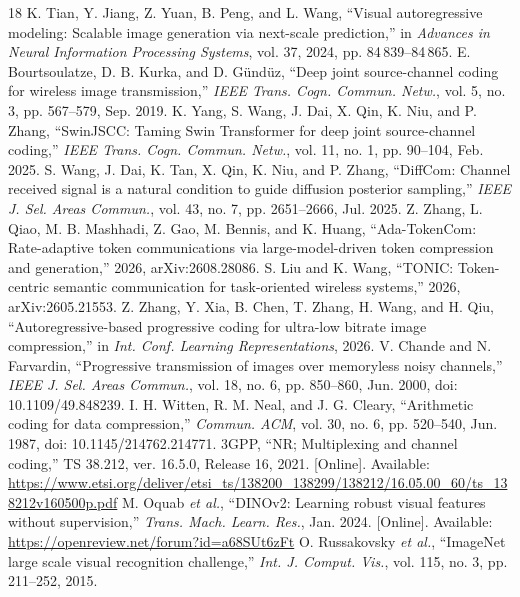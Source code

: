 \begin{thebibliography}{18}
 K. Tian, Y. Jiang, Z. Yuan, B. Peng, and L. Wang, ``Visual autoregressive modeling: Scalable image generation via next-scale prediction,'' in \emph{Advances in Neural Information Processing Systems}, vol. 37, 2024, pp. 84\,839--84\,865.
 E. Bourtsoulatze, D. B. Kurka, and D. G\"und\"uz, ``Deep joint source-channel coding for wireless image transmission,'' \emph{IEEE Trans. Cogn. Commun. Netw.}, vol. 5, no. 3, pp. 567--579, Sep. 2019.
 K. Yang, S. Wang, J. Dai, X. Qin, K. Niu, and P. Zhang, ``SwinJSCC: Taming Swin Transformer for deep joint source-channel coding,'' \emph{IEEE Trans. Cogn. Commun. Netw.}, vol. 11, no. 1, pp. 90--104, Feb. 2025.
 S. Wang, J. Dai, K. Tan, X. Qin, K. Niu, and P. Zhang, ``DiffCom: Channel received signal is a natural condition to guide diffusion posterior sampling,'' \emph{IEEE J. Sel. Areas Commun.}, vol. 43, no. 7, pp. 2651--2666, Jul. 2025.
 Z. Zhang, L. Qiao, M. B. Mashhadi, Z. Gao, M. Bennis, and K. Huang, ``Ada-TokenCom: Rate-adaptive token communications via large-model-driven token compression and generation,'' 2026, arXiv:2608.28086.
 S. Liu and K. Wang, ``TONIC: Token-centric semantic communication for task-oriented wireless systems,'' 2026, arXiv:2605.21553.
 Z. Zhang, Y. Xia, B. Chen, T. Zhang, H. Wang, and H. Qiu, ``Autoregressive-based progressive coding for ultra-low bitrate image compression,'' in \emph{Int. Conf. Learning Representations}, 2026.
 V. Chande and N. Farvardin, ``Progressive transmission of images over memoryless noisy channels,'' \emph{IEEE J. Sel. Areas Commun.}, vol. 18, no. 6, pp. 850--860, Jun. 2000, doi: 10.1109/49.848239.
 I. H. Witten, R. M. Neal, and J. G. Cleary, ``Arithmetic coding for data compression,'' \emph{Commun. ACM}, vol. 30, no. 6, pp. 520--540, Jun. 1987, doi: 10.1145/214762.214771.
 3GPP, ``NR; Multiplexing and channel coding,'' TS 38.212, ver. 16.5.0, Release 16, 2021. [Online]. Available: \url{https://www.etsi.org/deliver/etsi_ts/138200_138299/138212/16.05.00_60/ts_138212v160500p.pdf}
 M. Oquab \emph{et al.}, ``DINOv2: Learning robust visual features without supervision,'' \emph{Trans. Mach. Learn. Res.}, Jan. 2024. [Online]. Available: \url{https://openreview.net/forum?id=a68SUt6zFt}
 O. Russakovsky \emph{et al.}, ``ImageNet large scale visual recognition challenge,'' \emph{Int. J. Comput. Vis.}, vol. 115, no. 3, pp. 211--252, 2015.

\end{thebibliography}
